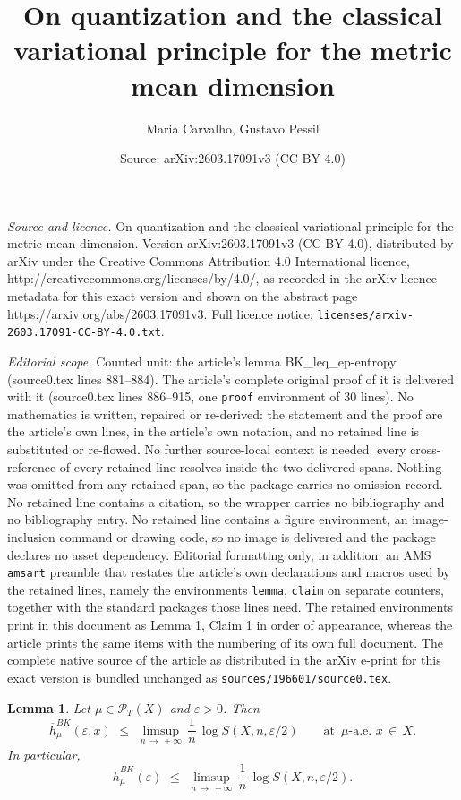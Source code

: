 \documentclass[10pt,a4paper]{amsart}
\title{On quantization and the classical variational principle for the metric mean dimension}
\author{Maria Carvalho, Gustavo Pessil}
\date{Source: arXiv:2603.17091v3 (CC BY 4.0)}
\newtheorem{lemma}{Lemma}
\newcommand{\cP}{{\mathcal P}}
\newcommand{\ep} {\varepsilon}
\newcommand{\vep}{\varepsilon}
\begin{document}
\maketitle

\noindent\emph{Source and licence.} On quantization and the classical variational principle for the metric mean dimension. Version arXiv:2603.17091v3 (CC BY 4.0), distributed by arXiv under the Creative Commons Attribution 4.0 International licence, http://creativecommons.org/licenses/by/4.0/, as recorded in the arXiv licence metadata for this exact version and shown on the abstract page https://arxiv.org/abs/2603.17091v3. Full licence notice: \texttt{licenses/arxiv-2603.17091-CC-BY-4.0.txt}.\par\smallskip

\noindent\textit{Editorial scope.} Counted unit: the article's lemma BK\_leq\_ep-entropy (source0.tex lines 881--884). The article's complete original proof of it is delivered with it (source0.tex lines 886--915, one \texttt{proof} environment of 30 lines). No mathematics is written, repaired or re-derived: the statement and the proof are the article's own lines, in the article's own notation, and no retained line is substituted or re-flowed.  No further source-local context is needed: every cross-reference of every retained line resolves inside the two delivered spans.  Nothing was omitted from any retained span, so the package carries no omission record.  No retained line contains a citation, so the wrapper carries no bibliography and no bibliography entry.  No retained line contains a figure environment, an image-inclusion command or drawing code, so no image is delivered and the package declares no asset dependency.  Editorial formatting only, in addition: an AMS \texttt{amsart} preamble that restates the article's own declarations and macros used by the retained lines, namely the environments \texttt{lemma}, \texttt{claim} on separate counters, together with the standard packages those lines need.  The retained environments print in this document as Lemma 1, Claim 1 in order of appearance, whereas the article prints the same items with the numbering of its own full document.  The complete native source of the article as distributed in the arXiv e-print for this exact version is bundled unchanged as \texttt{sources/196601/source0.tex}.
\begin{lemma}\label{BK_leq_ep-entropy}
Let $\mu\in\cP_T(X)$ and $\ep>0$. Then $$\overline{h}^{BK}_\mu(\ep,x)\,\,\leq\,\, \limsup_{n\, \to \, +\infty}\, \frac{1}{n}\,\log S(X,n,\vep/2)\qquad\text{at }\,\mu\text{-a.e. }x\,\in\,X.$$
In particular, $$\overline{h}^{BK}_\mu(\ep)\,\,\leq\,\, \limsup_{n\, \to \, +\infty}\, \frac{1}{n}\,\log S(X,n,\vep/2).$$
\end{lemma}
\end{document}
